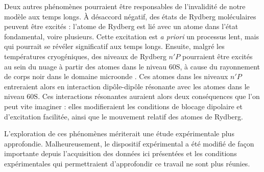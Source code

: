 Deux autres phénomènes pourraient être responsables de l'invalidité de notre modèle aux temps longs.
\`A désaccord négatif, des états de Rydberg \og moléculaires \fg{} peuvent être excités \cite{MX_PFAUMOLECULES14} : l'atome de Rydberg est lié avec un atome dans l'état fondamental, voire plusieurs. Cette excitation est \textit{a priori} un processus lent, mais qui pourrait se révéler significatif aux temps longs.
Ensuite, malgré les températures cryogéniques, des niveaux de Rydberg $n'P$ pourraient être excités au sein du nuage à partir des atomes dans le niveau $\mathrm{60S}$, à cause du rayonnement de corps noir dans le domaine microonde \cite{MX_PORTORYDDRESS16}.
Ces atomes dans les niveaux $n'P$ entreraient alors en interaction dipôle-dipôle résonante avec les atomes dans le niveau $\mathrm{60S}$.
Ces interactions résonantes auraient alors deux conséquences que l'on peut vite imaginer : elles modifieraient les conditions de blocage dipolaire et d'excitation facilitée, ainsi que le mouvement relatif des atomes de Rydberg. %

L'exploration de ces phénomènes mériterait une étude expérimentale plus approfondie.
Malheureusement, le dispositif expérimental a été modifié de façon importante depuis l'acquisition des données ici présentées et les conditions expérimentales qui permettraient d'approfondir ce travail ne sont plus réunies.



